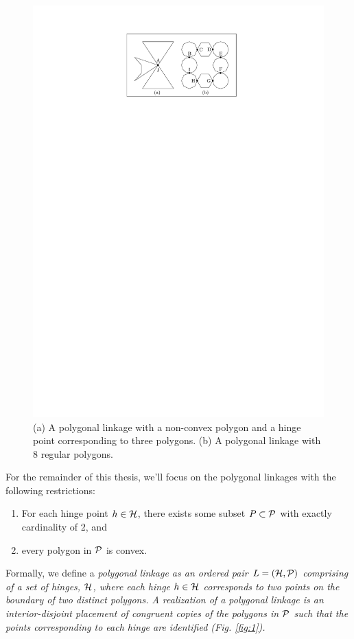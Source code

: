 \begin{figure}[h]
\begin{center}
\includegraphics[scale=1]{graphics/PolygonalLinkageExamples.pdf}
\end{center} 
\caption{(a) A polygonal linkage with a non-convex polygon and a hinge point corresponding to three 
polygons.  (b) A polygonal linkage with 8 regular polygons.}
\label{fig:linkage-2}
\end{figure}
For the remainder of this thesis, we'll focus on the polygonal linkages with the following 
restrictions:
\begin{enumerate}
 \item  For each hinge point $h \in {\cal H}$, there exists some subset $P \subset {\cal P}$ with 
exactly cardinality of 2, and
\item every polygon in ${\cal P}$ is convex.
\end{enumerate}
Formally, we define a \it{polygonal linkage} as an ordered pair $L = ({\cal H},{\cal P})$ comprising of a 
set of hinges, ${\cal H}$, where each hinge $h\in {\cal H}$ corresponds to two points on the boundary of two 
distinct polygons. A \emph{realization} of a polygonal linkage is an interior-disjoint placement of 
congruent copies of the polygons in ${\cal P}$ such that the points corresponding to each hinge are 
identified (Fig. \ref{fig:1}). 
